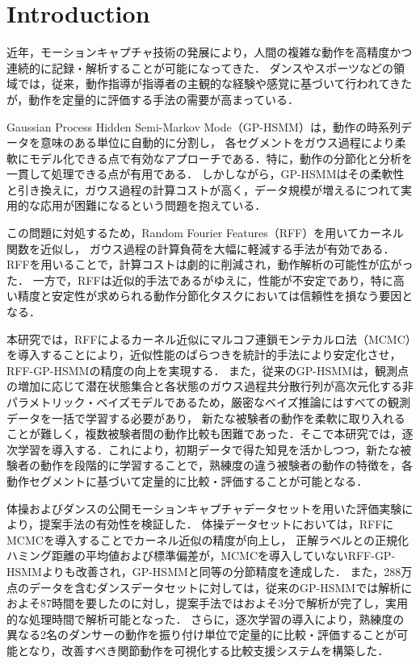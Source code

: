 \documentclass[conference]{IEEEtran}
\begin{document}
\section{Introduction}
近年，モーションキャプチャ技術の発展により，人間の複雑な動作を高精度かつ連続的に記録・解析することが可能になってきた\cite{Balazia2018, 3DPW2018, Thoker2021, Lam2023, Suo2024, DanceMVP2024}．
ダンスやスポーツなどの領域では，従来，動作指導が指導者の主観的な経験や感覚に基づいて行われてきたが，動作を定量的に評価する手法の需要が高まっている．

Gaussian Process Hidden Semi-Markov Mode（GP-HSMM）\cite{Nakamura2017}は，動作の時系列データを意味のある単位に自動的に分割し，
各セグメントをガウス過程により柔軟にモデル化できる点で有効なアプローチである．特に，動作の分節化と分析を一貫して処理できる点が有用である．
しかしながら，GP-HSMMはその柔軟性と引き換えに，ガウス過程の計算コストが高く，データ規模が増えるにつれて実用的な応用が困難になるという問題を抱えている．

この問題に対処するため，Random Fourier Features（RFF）\cite{Rahimi2007}を用いてカーネル関数を近似し，
ガウス過程の計算負荷を大幅に軽減する手法が有効である．RFFを用いることで，計算コストは劇的に削減され，動作解析の可能性が広がった．
一方で，RFFは近似的手法であるがゆえに，性能が不安定であり，特に高い精度と安定性が求められる動作分節化タスクにおいては信頼性を損なう要因となる．

本研究では，RFFによるカーネル近似にマルコフ連鎖モンテカルロ法（MCMC）\cite{Hastings1970}を導入することにより，近似性能のばらつきを統計的手法により安定化させ，RFF-GP-HSMMの精度の向上を実現する．
また，従来のGP-HSMMは，観測点の増加に応じて潜在状態集合と各状態のガウス過程共分散行列が高次元化する非パラメトリック・ベイズモデルであるため，厳密なベイズ推論にはすべての観測データを一括で学習する必要があり，
新たな被験者の動作を柔軟に取り入れることが難しく，複数被験者間の動作比較も困難であった．そこで本研究では，逐次学習\cite{Broderick2013}を導入する．これにより，初期データで得た知見を活かしつつ，新たな被験者の動作を段階的に学習することで，熟練度の違う被験者の動作の特徴を，各動作セグメントに基づいて定量的に比較・評価することが可能となる．

体操およびダンスの公開モーションキャプチャデータセットを用いた評価実験により，提案手法の有効性を検証した．
体操データセットにおいては，RFFにMCMCを導入することでカーネル近似の精度が向上し，
正解ラベルとの正規化ハミング距離の平均値および標準偏差が，MCMCを導入していないRFF-GP-HSMMよりも改善され，GP-HSMMと同等の分節精度を達成した．
また，288万点のデータを含むダンスデータセットに対しては，従来のGP-HSMMでは解析におよそ87時間を要したのに対し，提案手法ではおよそ3分で解析が完了し，実用的な処理時間で解析可能となった．
さらに，逐次学習の導入により，熟練度の異なる2名のダンサーの動作を振り付け単位で定量的に比較・評価することが可能となり，改善すべき関節動作を可視化する比較支援システムを構築した．
\end{document}
